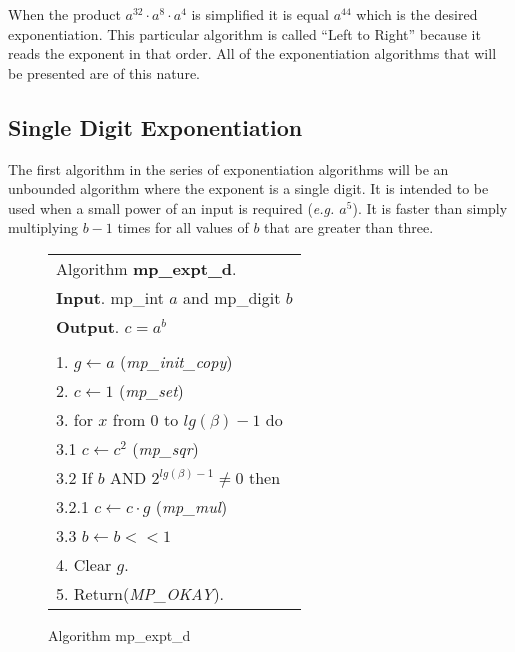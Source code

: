\documentclass[b5paper]{book}
\begin{document}
When the product $a^{32} \cdot a^8 \cdot a^4$ is simplified it is equal $a^{44}$ which is the desired exponentiation.  This particular algorithm is 
called ``Left to Right'' because it reads the exponent in that order.  All of the exponentiation algorithms that will be presented are of this nature.  

\subsection{Single Digit Exponentiation}
The first algorithm in the series of exponentiation algorithms will be an unbounded algorithm where the exponent is a single digit.  It is intended 
to be used when a small power of an input is required (\textit{e.g. $a^5$}).  It is faster than simply multiplying $b - 1$ times for all values of 
$b$ that are greater than three.  

\newpage\begin{figure}[!here]
\begin{small}
\begin{center}
\begin{tabular}{l}
\hline Algorithm \textbf{mp\_expt\_d}. \\
\textbf{Input}.   mp\_int $a$ and mp\_digit $b$ \\
\textbf{Output}.  $c = a^b$ \\
\hline \\
1.  $g \leftarrow a$ (\textit{mp\_init\_copy}) \\
2.  $c \leftarrow 1$ (\textit{mp\_set}) \\
3.  for $x$ from 0 to $lg(\beta) - 1$ do \\
\hspace{3mm}3.1  $c \leftarrow c^2$ (\textit{mp\_sqr}) \\
\hspace{3mm}3.2  If $b$ AND $2^{lg(\beta) - 1} \ne 0$ then \\
\hspace{6mm}3.2.1  $c \leftarrow c \cdot g$ (\textit{mp\_mul}) \\
\hspace{3mm}3.3  $b \leftarrow b << 1$ \\
4.  Clear $g$. \\
5.  Return(\textit{MP\_OKAY}). \\
\hline
\end{tabular}
\end{center}
\end{small}
\caption{Algorithm mp\_expt\_d}
\end{figure}
\end{document}
